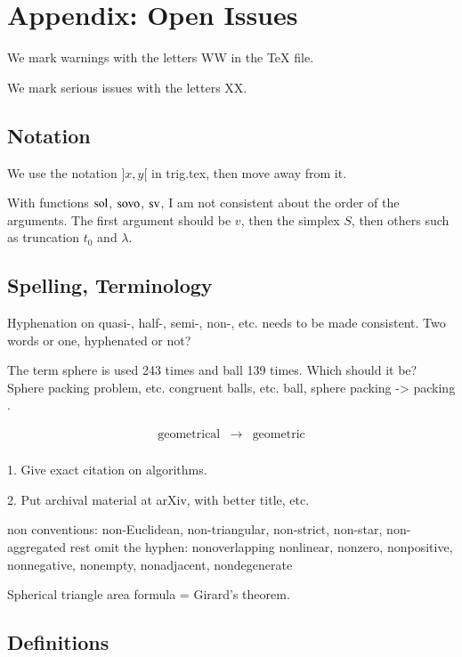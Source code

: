 \chapter{Appendix: Open Issues} %


We mark warnings with the letters WW in 
the TeX file.

We mark serious issues with the letters XX.

\section{Notation}

We use the notation $]x,y[$ in trig.tex, then move away from it.

With functions $\operatorname{sol}$, ${\operatorname{sovo}}$, ${\operatorname{sv}}$, I am not
consistent about the order of the arguments.
The first argument should be $v$, then the simplex $S$,
then others such as truncation $t_0$ and $\lambda$.

\section{Spelling, Terminology}

Hyphenation on  quasi-, half-, semi-, non-, etc. needs to be made
consistent.  Two words or one, hyphenated or not?

The term sphere is used 243 times and ball 139 times. Which should it be?
Sphere packing problem, etc.  congruent balls, etc.
ball, sphere packing -> packing .

$$
\begin{array}{lll}
 \text{geometrical} &\to& \text{geometric}\\
\end{array}
$$


 1. Give exact citation on algorithms.

 2. Put archival material at arXiv, with better title, etc.

 non conventions:
 non-Euclidean, non-triangular, non-strict, non-star, non-aggregated
 rest omit the hyphen: nonoverlapping nonlinear, nonzero, nonpositive, nonnegative,
   nonempty, nonadjacent, nondegenerate


Spherical triangle area formula = Girard's theorem.

\section{Definitions}

